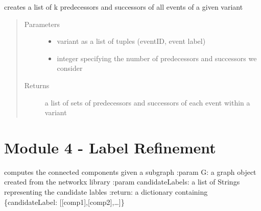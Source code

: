 \documentclass[letterpaper,10pt,english]{sphinxmanual}
\begin{document}
\begin{fulllineitems}
\label{\detokenize{cost function:costFunction.cost.context2}}
creates a list of k predecessors and successors of all events of a given variant
\begin{quote}\begin{description}
\item[{Parameters}] \leavevmode\begin{itemize}
\item {} 
 \textendash{} variant as a list of tuples (eventID, event label)

\item {} 
 \textendash{} integer specifying the number of predecessors and successors we consider

\end{itemize}

\item[{Returns}] \leavevmode
a list of sets of predecessors and successors of each event within a variant

\end{description}\end{quote}

\end{fulllineitems}


\begin{DUlineblock}{0em}
\item[] 
\end{DUlineblock}

{\hyperref[\detokenize{index:mastertoc}]{}}


\chapter{Module 4 - Label Refinement}
\label{\detokenize{refinement:module-4-label-refinement}}\label{\detokenize{refinement::doc}}
\begin{DUlineblock}{0em}
\item[] 
\end{DUlineblock}

\begin{fulllineitems}
\label{\detokenize{refinement:refinement.labelRefinement.connectedComponents}}
computes the connected components given a subgraph 
:param G: a graph object created from the networkx library
:param candidateLabels: a list of Strings representing the candidate lables
:return: a dictionary containing \{candidateLabel: {[}{[}comp1{]},{[}comp2{]},…{]}\}

\end{fulllineitems}
\end{document}

